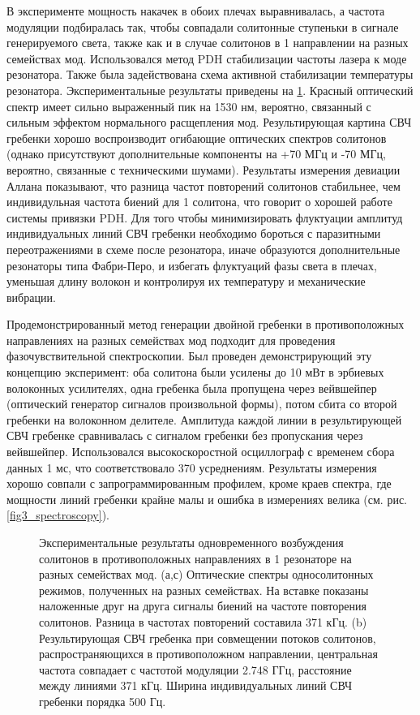 В эксперименте мощность накачек в обоих плечах выравнивалась, а частота модуляции подбиралась так, чтобы совпадали солитонные ступеньки в сигнале генерируемого света, также как и в случае солитонов в 1 направлении на разных семействах мод. Использовался метод PDH стабилизации частоты лазера к моде резонатора. Также была задействована схема активной стабилизации температуры резонатора. Экспериментальные результаты приведены на \ref{counter_prop_results}. Красный оптический спектр имеет сильно выраженный пик на 1530 нм, вероятно, связанный с сильным эффектом нормального расщепления мод. Результирующая картина СВЧ гребенки хорошо воспроизводит огибающие оптических спектров солитонов (однако присутствуют дополнительные компоненты на +70 МГц и -70 МГц, вероятно, связанные с техническими шумами). Результаты измерения девиации Аллана показывают, что разница частот повторений солитонов стабильнее, чем индивидульная частота биений для 1 солитона, что говорит о хорошей работе системы привязки PDH. Для того чтобы минимизировать флуктуации амплитуд индивидуальных линий СВЧ гребенки необходимо бороться с паразитными переотражениями в схеме после резонатора, иначе образуются дополнительные резонаторы типа Фабри-Перо, и избегать флуктуаций фазы света в плечах, уменьшая длину волокон и контролируя их температуру и механические вибрации.

Продемонстрированный метод генерации двойной гребенки в противоположных направлениях на разных семействах мод подходит для проведения фазочувствительной спектроскопии. Был проведен демонстрирующий эту концепцию эксперимент: оба солитона были усилены до 10 мВт в эрбиевых волоконных усилителях, одна гребенка была пропущена через вейвшейпер (оптический генератор сигналов произвольной формы), потом сбита со второй гребенки на волоконном делителе. Амплитуда каждой линии в результирующей СВЧ гребенке сравнивалась с сигналом гребенки без пропускания через вейвшейпер. Использовался высокоскоростной осциллограф с временем сбора данных 1 мс, что соответствовало 370 усреднениям. Результаты измерения хорошо совпали с запрограммированным профилем, кроме краев спектра, где мощности линий гребенки крайне малы и ошибка в измерениях велика (см. рис. \ref{fig3_spectroscopy}).

\begin{figure}[ht]
\begin{minipage}[ht]{1\linewidth}
\end{minipage}
\caption{Экспериментальные результаты одновременного возбуждения солитонов в противоположных направлениях в 1 резонаторе на разных семействах мод. (а,с) Оптические спектры односолитонных режимов, полученных на разных семействах. На вставке показаны наложенные друг на друга сигналы биений на частоте повторения солитонов. Разница в частотах повторений составила 371 кГц. (b) Результирующая СВЧ гребенка при совмещении потоков солитонов, распространяющихся в противоположном направлении, центральная частота совпадает с частотой модуляции 2.748 ГГц, расстояние между линиями 371 кГц. Ширина индивидуальных линий СВЧ гребенки порядка 500 Гц.}
\label{counter_prop_results}
\end{figure}

